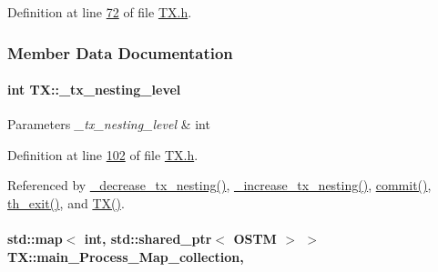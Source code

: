 Definition at line \hyperlink{_t_x_8h_source_l00072}{72} of file \hyperlink{_t_x_8h_source}{T\+X.\+h}.



\subsubsection{Member Data Documentation}
\paragraph[{\texorpdfstring{\+\_\+tx\+\_\+nesting\+\_\+level}{_tx_nesting_level}}]{\setlength{\rightskip}{0pt plus 5cm}int T\+X\+::\+\_\+tx\+\_\+nesting\+\_\+level\hspace{0.3cm}{\ttfamily [private]}}\hypertarget{class_t_x_ae8f413fd7f4fea322e7ad3c668f9898e_ae8f413fd7f4fea322e7ad3c668f9898e}{}\label{class_t_x_ae8f413fd7f4fea322e7ad3c668f9898e_ae8f413fd7f4fea322e7ad3c668f9898e}

\begin{DoxyParams}{Parameters}
{\em \+\_\+tx\+\_\+nesting\+\_\+level} & int \\
\hline
\end{DoxyParams}


Definition at line \hyperlink{_t_x_8h_source_l00102}{102} of file \hyperlink{_t_x_8h_source}{T\+X.\+h}.



Referenced by \hyperlink{_t_x_8cpp_source_l00316}{\+\_\+decrease\+\_\+tx\+\_\+nesting()}, \hyperlink{_t_x_8cpp_source_l00307}{\+\_\+increase\+\_\+tx\+\_\+nesting()}, \hyperlink{_t_x_8cpp_source_l00202}{commit()}, \hyperlink{_t_x_8cpp_source_l00052}{th\+\_\+exit()}, and \hyperlink{_t_x_8cpp_source_l00031}{T\+X()}.

\paragraph[{\texorpdfstring{main\+\_\+\+Process\+\_\+\+Map\+\_\+collection}{main_Process_Map_collection}}]{\setlength{\rightskip}{0pt plus 5cm}std\+::map$<$ int, std\+::shared\+\_\+ptr$<$ {\bf O\+S\+TM} $>$ $>$ T\+X\+::main\+\_\+\+Process\+\_\+\+Map\+\_\+collection\hspace{0.3cm}{\ttfamily [static]}, {\ttfamily [private]}}\hypertarget{class_t_x_a1a45d726894190695314464d7cd97c29_a1a45d726894190695314464d7cd97c29}{}\label{class_t_x_a1a45d726894190695314464d7cd97c29_a1a45d726894190695314464d7cd97c29}


